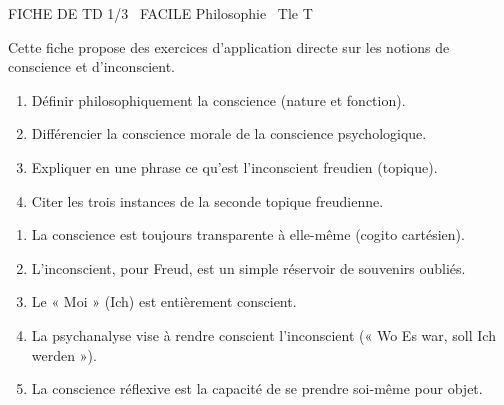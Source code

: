 \documentclass[11pt]{article}
\begin{document}
\begin{tcolorbox}[enhanced,colback=popink,colframe=popink,arc=10pt,boxrule=0pt,left=12pt,right=12pt,top=9pt,bottom=9pt]
{\color{white}\popxbold\small FICHE DE TD 1/3 \textbullet\ FACILE \hfill Philosophie \textbullet\ Tle T\par}
\end{tcolorbox}
\vspace{4pt}
Cette fiche propose des exercices d'application directe sur les notions de conscience et d'inconscient.

\begin{exercice}
\begin{enumerate}
    \item Définir philosophiquement la conscience (nature et fonction).
    \item Différencier la conscience morale de la conscience psychologique.
    \item Expliquer en une phrase ce qu'est l'inconscient freudien (topique).
    \item Citer les trois instances de la seconde topique freudienne.
\end{enumerate}
\end{exercice}

\begin{exercice}
\begin{enumerate}
    \item La conscience est toujours transparente à elle-même (cogito cartésien).
    \item L'inconscient, pour Freud, est un simple réservoir de souvenirs oubliés.
    \item Le « Moi » (Ich) est entièrement conscient.
    \item La psychanalyse vise à rendre conscient l'inconscient (« Wo Es war, soll Ich werden »).
    \item La conscience réflexive est la capacité de se prendre soi-même pour objet.
\end{enumerate}
\end{exercice}
\end{document}
